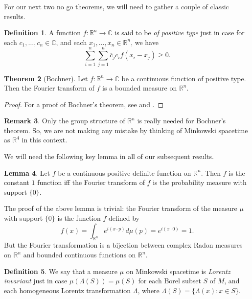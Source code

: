 \documentclass[11pt]{article}
\theoremstyle{definition}
\newtheorem{thm}{Theorem}[section]
\newtheorem{lemma}[thm]{Lemma}
\theoremstyle{definition}
\newtheorem{defn}[thm]{Definition}
\newtheorem{note}[thm]{Remark}
\theoremstyle{remark}
\def\7#1{{\mathbb #1}}
\def\ol#1{{\overline #1}}
\begin{document}
For our next two no go theorems, we will need to gather a couple of classic results.


\begin{defn} A function $f:\7R ^n\to \7C$ is said to be \emph{of
    positive type} just in case for each $c_1,\dots ,c_n\in \7C$, and
  each $x_1,\dots ,x_n\in \7R ^n$, we have
$$ \sum _{i=1}^n \sum _{j=1}^n\ol c_j c_i f(x_i-x_j) \geq 0 .$$
\end{defn}

\begin{thm}[Bochner] Let $f:\7R ^n\to \7C$ be a continuous function of positive type.
  Then the Fourier transform of $f$ is a bounded measure on $\7R ^n$.
\end{thm}

\begin{proof} For a proof of Bochner's theorem, see \cite[p.\ 303]{rudin2} and
  \cite[p.\ 95]{folland}.
\end{proof}

\begin{note} Only the group structure of $\7R ^n$ is really needed for Bochner's
  theorem.  So, we are not making any mistake by thinking of Minkowski spacetime as
  $\7R ^4$ in this context.  \end{note}

We will need the following key lemma in all of our subsequent results.

\begin{lemma} Let $f$ be a continuous positive definite function on
  $\7R ^n$.  Then $f$ is the constant $1$ function iff the Fourier
  transform of $f$ is the probability measure with support $\{ 0\}$.
  \label{pmass}
\end{lemma}

The proof of the above lemma is trivial: the Fourier transform of the
measure $\mu$ with support $\{ 0\}$ is the function $f$ defined by
$$ f(x)=\int _{\7R ^n}e^{i(x\cdot p)} d\mu (p) = e^{i(x\cdot 0)}= 1 .$$
But the Fourier transformation is a bijection between complex Radon measures on $\7R
^n$ and bounded continuous functions on $\7R ^n$.


\begin{defn} We say that a measure $\mu$ on Minkowski spacetime is
  \emph{Lorentz invariant} just in case $\mu (\Lambda (S))=\mu (S)$
  for each Borel subset $S$ of $M$, and each homogeneous Lorentz
  transformation $\Lambda$, where $\Lambda (S)=\{ \Lambda (x):x\in
  S\}$.  \end{defn}
\end{document}
